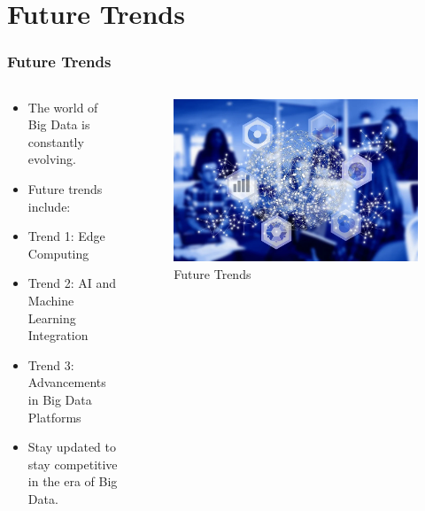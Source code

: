 \documentclass{beamer}
\begin{document}
\section{Future Trends}
	\begin{frame}
	\frametitle{Future Trends}
		\begin{columns}
			\begin{column}{0.5\textwidth}
				\begin{itemize}
  					\item The world of Big Data is constantly evolving.
  					\item Future trends include:
  					\item Trend 1: Edge Computing
  					\item Trend 2: AI and Machine Learning Integration
  					\item Trend 3: Advancements in Big Data Platforms
  					\item Stay updated to stay competitive in the era of Big Data.
				\end{itemize}
			\end{column}
			\begin{column}{0.5\textwidth}
				\begin{figure}
        		\includegraphics[width=\linewidth]{resources/fituretrends.png} %
        		\caption{Future Trends}
      			\end{figure}
			\end{column}
		\end{columns}
	\end{frame}

\end{document}

